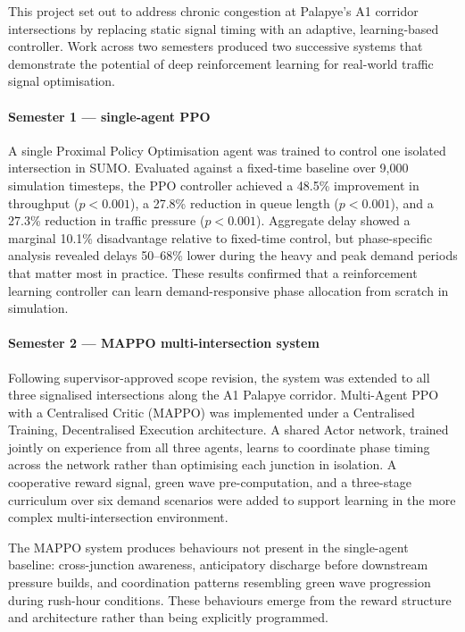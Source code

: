 \documentclass[11pt, a4paper]{report}
\begin{document}
This project set out to address chronic congestion at Palapye's A1 corridor intersections by replacing static signal timing with an adaptive, learning-based controller. Work across two semesters produced two successive systems that demonstrate the potential of deep reinforcement learning for real-world traffic signal optimisation.

\paragraph{Semester 1 --- single-agent PPO}

A single Proximal Policy Optimisation agent was trained to control one isolated intersection in SUMO. Evaluated against a fixed-time baseline over 9,000 simulation timesteps, the PPO controller achieved a 48.5\% improvement in throughput ($p < 0.001$), a 27.8\% reduction in queue length ($p < 0.001$), and a 27.3\% reduction in traffic pressure ($p < 0.001$). Aggregate delay showed a marginal 10.1\% disadvantage relative to fixed-time control, but phase-specific analysis revealed delays 50--68\% lower during the heavy and peak demand periods that matter most in practice. These results confirmed that a reinforcement learning controller can learn demand-responsive phase allocation from scratch in simulation.

\paragraph{Semester 2 --- MAPPO multi-intersection system}

Following supervisor-approved scope revision, the system was extended to all three signalised intersections along the A1 Palapye corridor. Multi-Agent PPO with a Centralised Critic (MAPPO) was implemented under a Centralised Training, Decentralised Execution architecture. A shared Actor network, trained jointly on experience from all three agents, learns to coordinate phase timing across the network rather than optimising each junction in isolation. A cooperative reward signal, green wave pre-computation, and a three-stage curriculum over six demand scenarios were added to support learning in the more complex multi-intersection environment.

The MAPPO system produces behaviours not present in the single-agent baseline: cross-junction awareness, anticipatory discharge before downstream pressure builds, and coordination patterns resembling green wave progression during rush-hour conditions. These behaviours emerge from the reward structure and architecture rather than being explicitly programmed.
\end{document}
